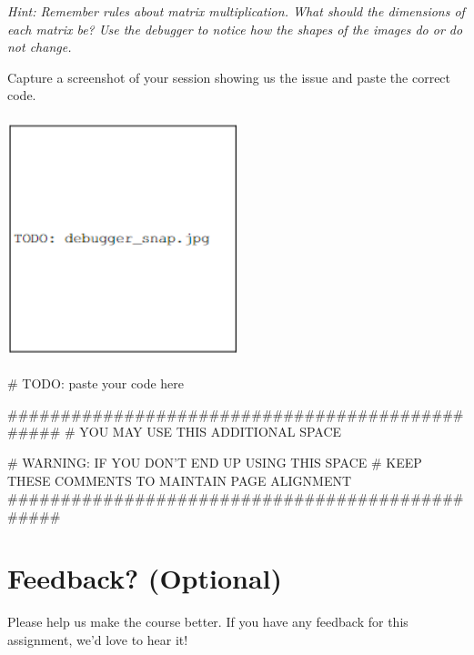 \documentclass[11pt]{article}
\begin{document}
\emph{Hint: Remember rules about matrix multiplication. What should the dimensions of each matrix be? Use the debugger to notice how the shapes of the images do or do not change.}

Capture a screenshot of your session showing us the issue and paste the correct code.

\begin{tcolorbox}[colback=white!5!white,colframe=green!75!black,breakable,height=15cm,enhanced jigsaw,pad at break*=1mm]
    \includegraphics[width=0.5\textwidth,height=7cm,keepaspectratio]{images/TODO_debugger_snap.jpg}
    
    \begin{python}
    # TODO: paste your code here
    
    
    
    
    
    
    
    
    
    
    
    
    
    
    
    ################################################
    # YOU MAY USE THIS ADDITIONAL SPACE
    
    # WARNING: IF YOU DON'T END UP USING THIS SPACE
    # KEEP THESE COMMENTS TO MAINTAIN PAGE ALIGNMENT
    ################################################
    \end{python}
    
\end{tcolorbox}

\pagebreak
\section*{Feedback? (Optional)}
Please help us make the course better. If you have any feedback for this assignment, we'd love to hear it!
\end{document}
